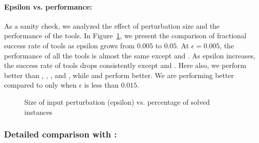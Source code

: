 \paragraph{Epsilon vs. performance: }
As a sanity check, we analyzed the effect of perturbation size and the performance of the tools.
In Figure~\ref{res:ep:milp_with_milp}, we present the comparison of fractional success rate of tools as epsilon grows from $0.005$ to $0.05$. 
At $\epsilon=0.005$, the performance of all the tools is almost the same except \cegarnn{} and \marabou{}.
As epsilon increases, the success rate of tools drops consistently except \cegarnn{} and \marabou{}. Here also, we perform better than \deeppoly{}, 
\kpoly{}, \deepsrgr{}, and \cegarnn{}, while \alphabeta{} and \ovaltool{} perform better.
We are performing better compared to \marabou{} only when $\epsilon$ is less than $0.015$. 


\begin{figure}[]    \centering
\scalebox{0.8}{
  
  }
    \caption{Size of input perturbation (epsilon) vs. percentage of solved instances}
    \label{res:ep:milp_with_milp}
\end{figure}


\subsubsection{Detailed comparison with \alphabeta{}: } 
